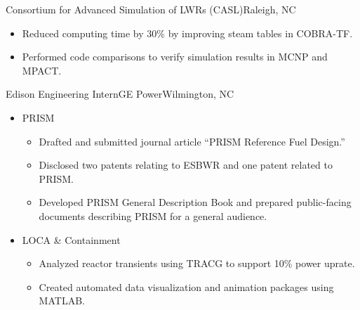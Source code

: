 \documentclass[letterpaper,11pt,nocolor,final]{moderncv}
\begin{document}

{Consortium for Advanced Simulation of LWRs (CASL)}{Raleigh, NC}{}{
  \begin{itemize}
    \item Reduced computing time by 30\% by improving steam tables in COBRA-TF.
    \item Performed code comparisons to verify simulation results in MCNP and 
      MPACT.
  \end{itemize}}

{Edison Engineering Intern}{GE Power}{Wilmington, NC}{}{
  \begin{itemize}
    \item PRISM 
    \begin{itemize}
      \item Drafted and submitted journal article
        ``PRISM Reference Fuel Design.''
      \item Disclosed two patents relating to ESBWR and one patent related to 
        PRISM.
      \item Developed PRISM General Description Book and prepared public-facing
        documents describing PRISM for a general audience.
    \end{itemize}
    \item LOCA \& Containment 
    \begin{itemize}
      \item Analyzed reactor transients using TRACG to support 10\% power 
        uprate.
      \item Created automated data visualization and animation packages using 
        MATLAB.
    \end{itemize}
  \end{itemize}}
\end{document}
